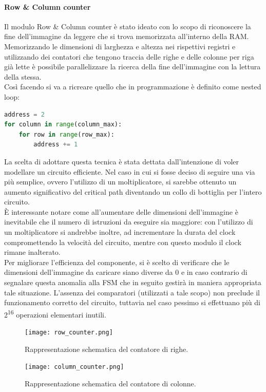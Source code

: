 \paragraph{Row \& Column counter\\}

Il modulo Row \& Column counter è stato ideato con lo scopo di riconoscere la fine dell'immagine da leggere che si trova memorizzata all'interno della RAM.\\
Memorizzando le dimensioni di larghezza e altezza nei rispettivi registri e utilizzando dei contatori che tengono traccia delle righe e delle colonne per riga già lette è possibile parallelizzare la ricerca della fine dell'immagine con la lettura della stessa.\\
Così facendo si va a ricreare quello che in programmazione è definito come nested loop:

\begin{lstlisting}[language=Python, caption={Nested loop in pseudocodice.},captionpos=b]
address = 2
for column in range(column_max):
    for row in range(row_max):
        address += 1
\end{lstlisting}

La scelta di adottare questa tecnica è stata dettata dall'intenzione di voler modellare un circuito efficiente. Nel caso in cui si fosse deciso di seguire una via più semplice, ovvero l'utilizzo di un moltiplicatore, si sarebbe ottenuto un aumento significativo del critical path diventando un collo di bottiglia per l'intero circuito.\\
È interessante notare come all'aumentare delle dimensioni dell'immagine è inevitabile che il numero di istruzioni da eseguire sia maggiore: con l'utilizzo di un moltiplicatore si andrebbe inoltre, ad incrementare la durata del clock compromettendo la velocità del circuito, mentre con questo modulo il clock rimane inalterato.\\
Per migliorare l'efficienza del componente, si è scelto di verificare che le dimensioni dell'immagine da caricare siano diverse da 0 e in caso contrario di segnalare questa anomalia alla FSM che in seguito gestirà in maniera appropriata tale situazione. L'assenza dei comparatori (utilizzati a tale scopo) non preclude il funzionamento corretto del circuito, tuttavia nel caso pessimo si effettuano più di 2\textsuperscript{16} operazioni elementari inutili.

\begin{figure}[h!]
\centering
\texttt{[image: row\_counter.png]}%
\caption{Rappresentazione schematica del contatore di righe.}
\end{figure}
\begin{figure}[h!]
\centering
\texttt{[image: column\_counter.png]} %
\caption{Rappresentazione schematica del contatore di colonne.}
\end{figure}

